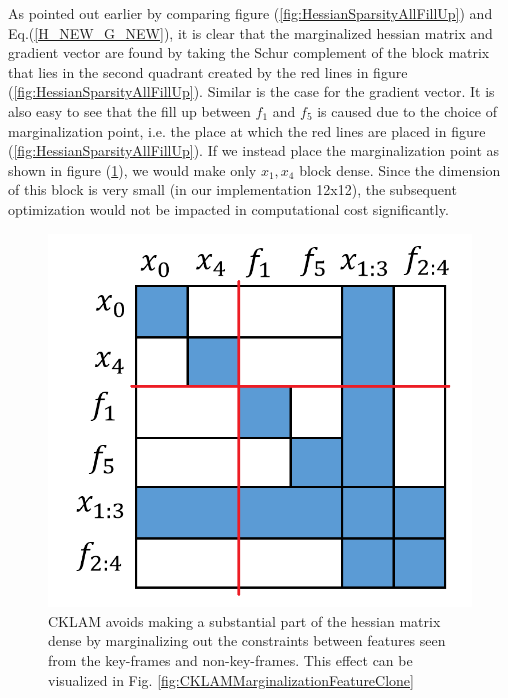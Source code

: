 As pointed out earlier by comparing figure (\ref{fig:HessianSparsityAllFillUp}) and Eq.(\ref{H_NEW_G_NEW}), it is clear that the marginalized hessian matrix and gradient vector are found by taking the Schur complement of the block matrix that lies in the second quadrant created by the red lines in figure (\ref{fig:HessianSparsityAllFillUp}). Similar is the case for the gradient vector. It is also easy to see that the fill up between $f_1$ and $f_5$ is caused due to the choice of marginalization point, i.e. the place at which the red lines are placed in figure (\ref{fig:HessianSparsityAllFillUp}). If we instead place the marginalization point as shown in figure (\ref{fig:HessianSparsityAllFillUpKeepSparsity}), we would make only $x_1, x_4$ block dense. Since the dimension of this block is very small (in our implementation 12x12), the subsequent optimization would not be impacted in computational cost significantly.

\begin{figure}[ht]
	\centering
		\includegraphics[width=1.00\textwidth]{images/HessianSparsityAllFillUpKeepSparsity.png}
  \caption{CKLAM avoids making a substantial part of the hessian matrix dense by marginalizing out the constraints between features seen from the key-frames and non-key-frames. This effect can be visualized in Fig. \ref{fig:CKLAMMarginalizationFeatureClone}}
  \label{fig:HessianSparsityAllFillUpKeepSparsity}
\end{figure}

